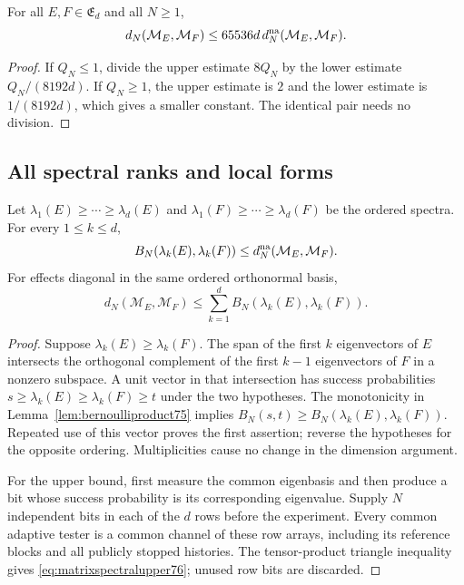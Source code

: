 \begin{corollary}
\label{cor:matrixadaptivity76}
For all $E,F\in\mathfrak E_d$ and all $N\ge1$,
\begin{equation}\label{eq:matrixadaptivity76}
 d_N(\mathcal M_E,\mathcal M_F)
           \le65536d\,d_N^{\rm na}(\mathcal M_E,\mathcal M_F).
\end{equation}
\end{corollary}
\begin{proof}
If $Q_N\le1$, divide the upper estimate $8Q_N$ by the lower
estimate $Q_N/(8192d)$.  If $Q_N\ge1$, the upper estimate is
$2$ and the lower estimate is $1/(8192d)$, which gives a smaller
constant.  The identical pair needs no division.
\end{proof}

\subsection{All spectral ranks and local forms}

\begin{lemma}
\label{lem:matrixspectral76}
Let $\lambda_1(E)\ge\cdots\ge\lambda_d(E)$ and
$\lambda_1(F)\ge\cdots\ge\lambda_d(F)$ be the ordered spectra.
For every $1\le k\le d$,
\begin{equation}\label{eq:matrixspectrallower76}
 B_N(\lambda_k(E),\lambda_k(F))
                   \le d_N^{\rm na}(\mathcal M_E,\mathcal M_F).
\end{equation}
For effects diagonal in the same ordered orthonormal basis,
\begin{equation}\label{eq:matrixspectralupper76}
 d_N(\mathcal M_E,\mathcal M_F)
       \le\sum_{k=1}^d B_N(\lambda_k(E),\lambda_k(F)).
\end{equation}
\end{lemma}
\begin{proof}
Suppose $\lambda_k(E)\ge\lambda_k(F)$.  The span of the first
$k$ eigenvectors of $E$ intersects the orthogonal complement of
the first $k-1$ eigenvectors of $F$ in a nonzero subspace.  A unit
vector in that intersection has success probabilities
$s\ge\lambda_k(E)\ge\lambda_k(F)\ge t$ under the two
hypotheses.  The monotonicity in
Lemma~\ref{lem:bernoulliproduct75} implies
$B_N(s,t)\ge B_N(\lambda_k(E),\lambda_k(F))$.
Repeated use of this vector proves the first assertion; reverse
the hypotheses for the opposite ordering.  Multiplicities cause
no change in the dimension argument.

For the upper bound, first measure the common eigenbasis and then
produce a bit whose success probability is its corresponding
eigenvalue.  Supply $N$ independent bits in each of the $d$ rows
before the experiment.  Every common adaptive tester is a common
channel of these row arrays, including its reference blocks and
all publicly stopped histories.  The tensor-product triangle
inequality gives \eqref{eq:matrixspectralupper76}; unused row
bits are discarded.
\end{proof}


